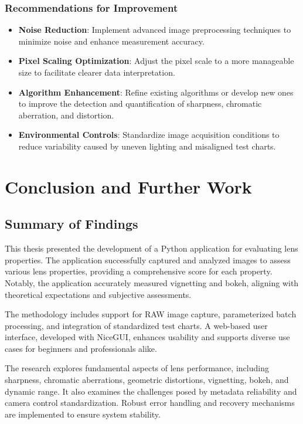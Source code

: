 \subsection{Recommendations for Improvement}
\begin{itemize}
    \item \textbf{Noise Reduction}: Implement advanced image preprocessing techniques to minimize noise and enhance measurement accuracy.
    \item \textbf{Pixel Scaling Optimization}: Adjust the pixel scale to a more manageable size to facilitate clearer data interpretation.
    \item \textbf{Algorithm Enhancement}: Refine existing algorithms or develop new ones to improve the detection and quantification of sharpness, chromatic aberration, and distortion.
    \item \textbf{Environmental Controls}: Standardize image acquisition conditions to reduce variability caused by uneven lighting and misaligned test charts.
\end{itemize}

\chapter{Conclusion and Further Work}

\section{Summary of Findings}
This thesis presented the development of a Python application for evaluating lens properties. The application successfully captured and analyzed images to assess various lens properties, providing a comprehensive score for each property. Notably, the application accurately measured vignetting and bokeh, aligning with theoretical expectations and subjective assessments.

The methodology includes support for RAW image capture, parameterized batch processing, and integration of standardized test charts. A web-based user interface, developed with NiceGUI, enhances usability and supports diverse use cases for beginners and professionals alike.

The research explores fundamental aspects of lens performance, including sharpness, chromatic aberrations, geometric distortions, vignetting, bokeh, and dynamic range. It also examines the challenges posed by metadata reliability and camera control standardization. Robust error handling and recovery mechanisms are implemented to ensure system stability.

